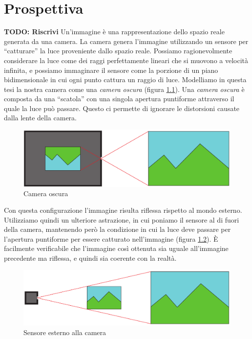 \chapter{Prospettiva}
\label{sec:prospettiva}

\textbf{TODO: Riscrivi}
Un'immagine è una rappresentazione dello spazio reale generata da una camera.
La camera genera l'immagine utilizzando un sensore per ``catturare'' la luce proveniente dallo spazio reale. 
Possiamo ragionevolmente considerare la luce come dei raggi perfettamente lineari che si muovono a velocità infinita, e possiamo immaginare il sensore come la porzione di un piano bidimensionale in cui ogni punto cattura un raggio di luce.
Modelliamo in questa tesi la nostra camera come una \emph{camera oscura} (figura \ref{fig:camera oscura}).
Una \emph{camera oscura} è composta da una ``scatola'' con una singola apertura puntiforme attraverso il quale la luce può passare.
Questo ci permette di ignorare le distorsioni causate dalla lente della camera.
\begin{figure}
    \caption{Camera oscura}
    \label{fig:camera oscura}
    \centering
    \includegraphics[width=\textwidth]{images/camera oscura.pdf}
\end{figure}

Con questa configurazione l'immagine risulta riflessa rispetto al mondo esterno.
Utilizziamo quindi un ulteriore astrazione, in cui poniamo il sensore al di fuori della camera, mantenendo però la condizione in cui la luce deve passare per l'apertura puntiforme per essere catturato nell'immagine (figura \ref{fig:camera model}).
È facilmente verificabile che l'immagine così ottenuta sia uguale all'immagine precedente ma riflessa, e quindi sia coerente con la realtà.
\begin{figure}
    \caption{Sensore esterno alla camera}
    \label{fig:camera model}
    \centering
    \includegraphics[width=\textwidth]{images/camera astratta.pdf}
\end{figure}

